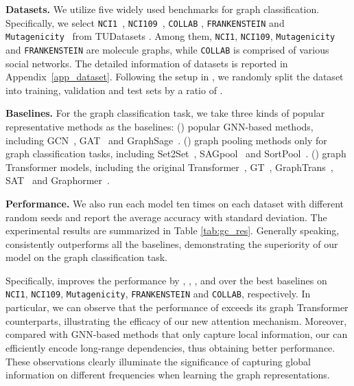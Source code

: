 \documentclass[sigconf, screen]{acmart}
\begin{document}
\textbf{Datasets.} 
We utilize five widely used benchmarks for graph classification.
Specifically, we select \texttt{NCI1}~\cite{nci}, \texttt{NCI109}~\cite{nci}, \texttt{COLLAB} \cite{collab}, \texttt{FRANKENSTEIN} \cite{frank} and \texttt{Mutagenicity}~\cite{mutag} from TUDatasets \cite{tudataset}. 
Among them, \texttt{NCI1}, \texttt{NCI109}, \texttt{Mutagenicity} and \texttt{FRANKENSTEIN} are molecule graphs, while \texttt{COLLAB} is comprised of various social networks.
The detailed information of datasets is reported in Appendix~\ref{app_dataset}.
Following the setup in \cite{nci, graphtrans}, we randomly split the dataset into training, validation and test sets by a ratio of .

\textbf{Baselines.}
For the graph classification task, we take three kinds of popular representative methods as the baselines: (\uppercase\expandafter{})
popular GNN-based methods, including GCN~\cite{gcn}, GAT~\cite{gat} and GraphSage~\cite{graphsage}. 
(\uppercase\expandafter{}) graph pooling methods only for graph classification tasks, including Set2Set~\cite{set2set}, SAGpool~\cite{sagpool} and SortPool~\cite{sortpool}.
(\uppercase\expandafter{}) graph Transformer models, including the original Transformer~\cite{transformer}, GT~\cite{gt}, GraphTrans~\cite{graphtrans},  SAT~\cite{sat} and Graphormer~\cite{graphormer}. 

\textbf{Performance.} 
We also run each model ten times on each dataset with different random seeds and report the average accuracy with standard deviation. 
The experimental results are summarized in Table \ref{tab:gc_res}. 
Generally speaking, \name consistently outperforms all the baselines, demonstrating the superiority of our model on the graph classification task.

Specifically, \name improves the performance by , , ,  and  over the best baselines on \texttt{NCI1}, \texttt{NCI109}, \texttt{Mutagenicity}, \texttt{FRANKENSTEIN} and \texttt{COLLAB}, respectively. 
In particular, we can observe that the performance of \name exceeds its graph Transformer counterparts, illustrating the efficacy of our new attention mechanism. 
Moreover, compared with GNN-based methods that only capture local information, our \name can efficiently encode long-range dependencies, thus obtaining better performance. 
These observations clearly illuminate the significance of capturing global information on different frequencies when learning the graph representations.
\end{document}
